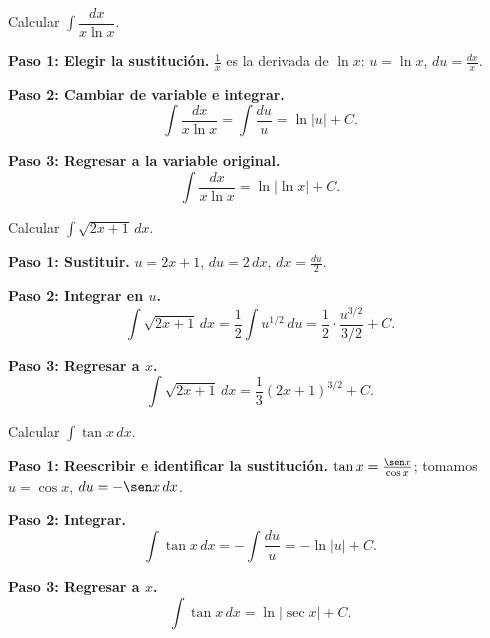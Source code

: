\begin{example}
Calcular $\displaystyle\int \dfrac{dx}{x \ln x}$.

\begin{myproof}

\textbf{Paso 1: Elegir la sustitución.}
$\frac{1}{x}$ es la derivada de $\ln x$: $u = \ln x$, $du = \frac{dx}{x}$.

\textbf{Paso 2: Cambiar de variable e integrar.}
\[
\int \frac{dx}{x \ln x} = \int \frac{du}{u} = \ln|u| + C.
\]

\textbf{Paso 3: Regresar a la variable original.}
\[
\boxed{\int \frac{dx}{x \ln x} = \ln|\ln x| + C.}
\]
\end{myproof}
\end{example}

\begin{example}
Calcular $\displaystyle\int \sqrt{2x+1}\, dx$.

\begin{myproof}

\textbf{Paso 1: Sustituir.}
$u = 2x+1$, $du = 2\,dx$, $dx = \frac{du}{2}$.

\textbf{Paso 2: Integrar en $u$.}
\[
\int \sqrt{2x+1}\, dx = \frac{1}{2}\int u^{1/2}\, du
= \frac{1}{2}\cdot\frac{u^{3/2}}{3/2} + C.
\]

\textbf{Paso 3: Regresar a $x$.}
\[
\boxed{\int \sqrt{2x+1}\, dx = \frac{1}{3}(2x+1)^{3/2} + C.}
\]
\end{myproof}
\end{example}

\begin{example}
Calcular $\displaystyle\int \tan x\, dx$.

\begin{myproof}

\textbf{Paso 1: Reescribir e identificar la sustitución.}
$\tan x = \frac{\sen x}{\cos x}$; tomamos $u = \cos x$, $du = -\sen x\, dx$.

\textbf{Paso 2: Integrar.}
\[
\int \tan x\, dx = -\int \frac{du}{u} = -\ln|u| + C.
\]

\textbf{Paso 3: Regresar a $x$.}
\[
\boxed{\int \tan x\, dx = \ln|\sec x| + C.}
\]
\end{myproof}
\end{example}

